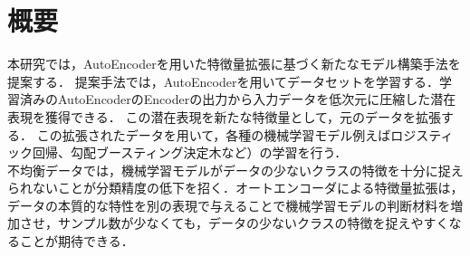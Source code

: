 \section{概要}
本研究では，AutoEncoderを用いた特徴量拡張に基づく新たなモデル構築手法を提案する．
提案手法では，AutoEncoderを用いてデータセットを学習する．学習済みのAutoEncoderのEncoderの出力から入力データを低次元に圧縮した潜在表現を獲得できる．
この潜在表現を新たな特徴量として，元のデータを拡張する．
この拡張されたデータを用いて，各種の機械学習モデル例えばロジスティック回帰、勾配ブースティング決定木など）の学習を行う．
\\
不均衡データでは，機械学習モデルがデータの少ないクラスの特徴を十分に捉えられないことが分類精度の低下を招く．オートエンコーダによる特徴量拡張は，データの本質的な特性を別の表現で与えることで機械学習モデルの判断材料を増加させ，サンプル数が少なくても，データの少ないクラスの特徴を捉えやすくなることが期待できる．\\


